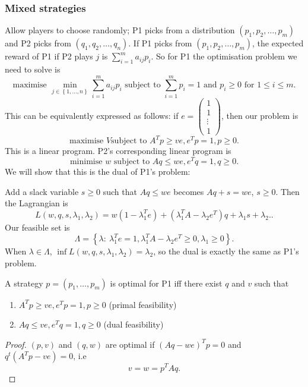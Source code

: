 \documentclass[egregdoesnotlikesansseriftitles,a4paper]{scrartcl}
\begin{document}
\subsubsection{Mixed strategies}
Allow players to choose randomly; P1 picks from a distribution $(p_1,p_2,\ldots ,p_m)$ and P2 picks from $(q_1,q_2,\ldots ,q_n)$. If P1 picks from $(p_1,p_2,\ldots ,p_m)$, the expected reward of P1 if P2 plays $j$ is $\sum_{i=1}^{m}a_{ij}p_i$. So for P1 the optimisation problem we need to solve is 
\[\text{maximise } \min_{j \in \left\{1,\ldots ,n\right\}}\sum_{i=1}^{m}a_{ij}p_i \text{ subject to } \sum_{i=1}^{m}p_i=1 \text{ and } p_i \geq 0 \text{ for } 1 \leq i \leq m.\]
This can be equivalently expressed as follows: if $e=\begin{pmatrix} 1\\1\\\vdots\\1 \end{pmatrix}$, then our problem is  \[
\text{maximise } V \text{subject to } A^{T}p \geq ve, e^{T}p=1,p \geq 0 
.\] 
This is a linear program. P2's corresponding linear program is \[
\text{minimise } w \text{ subject to } Aq \leq we, e^{T}q=1, q \geq 0
.\]
We will show that this is the dual of P1's problem:

Add a slack variable $s \geq 0$ such that $Aq \leq we$ becomes $Aq+s=we$, $s \geq 0$. Then the Lagrangian is \[
L (w,q,s, \lambda_1 , \lambda_2 )=w (1-\lambda_1^{T}e)+(\lambda_1^{T}A-\lambda_2 e^{T})q+\lambda_1 s+\lambda_2. 
.\]
Our feasible set is \[
	\Lambda=\left\{\lambda: \ \lambda_1^{T}e=1, \lambda_1^{T}A-\lambda_2 e^{T}\geq 0, \lambda_1 \geq 0\right\}
.\]
When $\lambda \in \Lambda$, $\inf L (w,q,s,\lambda_1,\lambda_2)=\lambda_2$, so the dual is exactly the same as P1's problem.
\begin{theorem}
	 A strategy $p=(p_1 ,\ldots ,p_m)$ is optimal for P1 iff there exist  $q$ and $v$ such that 
	 \begin{enumerate}
		 \item $A^{T}p \geq ve, e^{T}p=1, p\geq 0$ (primal feasibility)
		 \item $Aq \leq ve, e^{T}q=1, q\geq 0$ (dual feasibility)
	 \end{enumerate} 
\end{theorem} 
\begin{proof}
	 $(p,v)$ and $(q,w)$ are optimal if $(Aq-we)^Tp=0$ and $q^t (A^{T}p-ve)=0$, i.e \[
	 v=w=p^{T}Aq
	 .\] 
\end{proof}
\end{document}
